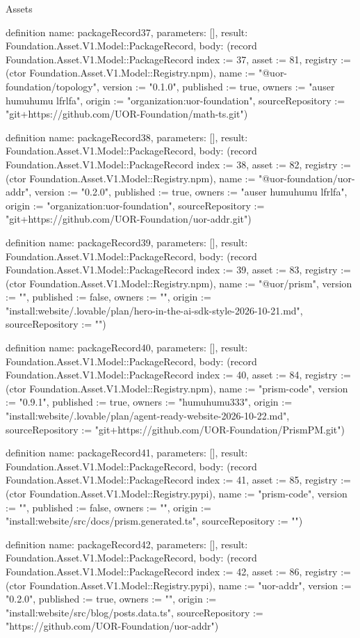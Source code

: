 \begin{lexlean}{Assets}
\begin{semanticmodule}
definition{
  name: packageRecord37,
  parameters: [],
  result: Foundation.Asset.V1.Model::PackageRecord,
  body: (record Foundation.Asset.V1.Model::PackageRecord {index := 37, asset := 81, registry := (ctor Foundation.Asset.V1.Model::Registry.npm), name := "@uor-foundation/topology", version := "0.1.0", published := true, owners := "auser humuhumu lfrlfa", origin := "organization:uor-foundation", sourceRepository := "git+https://github.com/UOR-Foundation/math-ts.git"})
}

definition{
  name: packageRecord38,
  parameters: [],
  result: Foundation.Asset.V1.Model::PackageRecord,
  body: (record Foundation.Asset.V1.Model::PackageRecord {index := 38, asset := 82, registry := (ctor Foundation.Asset.V1.Model::Registry.npm), name := "@uor-foundation/uor-addr", version := "0.2.0", published := true, owners := "auser humuhumu lfrlfa", origin := "organization:uor-foundation", sourceRepository := "git+https://github.com/UOR-Foundation/uor-addr.git"})
}

definition{
  name: packageRecord39,
  parameters: [],
  result: Foundation.Asset.V1.Model::PackageRecord,
  body: (record Foundation.Asset.V1.Model::PackageRecord {index := 39, asset := 83, registry := (ctor Foundation.Asset.V1.Model::Registry.npm), name := "@uor/prism", version := "", published := false, owners := "", origin := "install:website/.lovable/plan/hero-in-the-ai-sdk-style-2026-10-21.md", sourceRepository := ""})
}

definition{
  name: packageRecord40,
  parameters: [],
  result: Foundation.Asset.V1.Model::PackageRecord,
  body: (record Foundation.Asset.V1.Model::PackageRecord {index := 40, asset := 84, registry := (ctor Foundation.Asset.V1.Model::Registry.npm), name := "prism-code", version := "0.9.1", published := true, owners := "humuhumu333", origin := "install:website/.lovable/plan/agent-ready-website-2026-10-22.md", sourceRepository := "git+https://github.com/UOR-Foundation/PrismPM.git"})
}

definition{
  name: packageRecord41,
  parameters: [],
  result: Foundation.Asset.V1.Model::PackageRecord,
  body: (record Foundation.Asset.V1.Model::PackageRecord {index := 41, asset := 85, registry := (ctor Foundation.Asset.V1.Model::Registry.pypi), name := "prism-code", version := "", published := false, owners := "", origin := "install:website/src/docs/prism.generated.ts", sourceRepository := ""})
}

definition{
  name: packageRecord42,
  parameters: [],
  result: Foundation.Asset.V1.Model::PackageRecord,
  body: (record Foundation.Asset.V1.Model::PackageRecord {index := 42, asset := 86, registry := (ctor Foundation.Asset.V1.Model::Registry.pypi), name := "uor-addr", version := "0.2.0", published := true, owners := "", origin := "install:website/src/blog/posts.data.ts", sourceRepository := "https://github.com/UOR-Foundation/uor-addr"})
}


\end{semanticmodule}
\end{lexlean}
